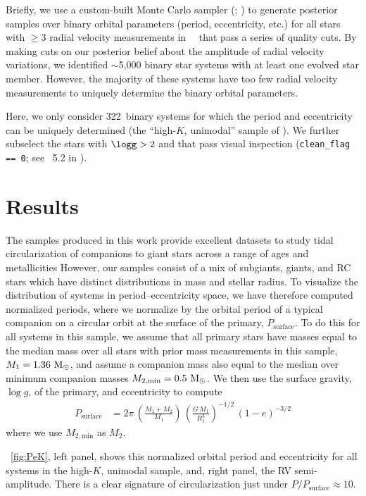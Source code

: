 \documentclass[modern, letterpaper]{aastex62}
\newcommand{\apogee}{\project{\acronym{APOGEE}}}
\newcommand{\DR}{\acronym{DR14}}
\newcommand{\nunimodal}{322}
\begin{document}
Briefly, we use a custom-built Monte Carlo sampler (;
\citealt{Price-Whelan:2017}) to generate posterior samples over binary orbital
parameters (period, eccentricity, etc.) for all stars with $\geq 3$ radial
velocity measurements in \apogee\ \DR\ that pass a series of quality cuts.
By making cuts on our posterior belief about the amplitude of radial velocity
variations, we identified $\sim$5,000 binary star systems with at least one
evolved star member.
However, the majority of these systems have too few radial velocity measurements
to uniquely determine the binary orbital parameters.

Here, we only consider \nunimodal\ binary systems for which the period and
eccentricity can be uniquely determined (the ``high-$K$, unimodal'' sample of
\citealt{Price-Whelan:2018}).
We further subselect the  stars with $\logg > 2$ and that pass visual
inspection (\texttt{clean\_flag == 0}; see \sectionname~5.2 in
\citealt{Price-Whelan:2018}).

\section{Results}
\label{sec:results}

The samples produced in this work provide excellent datasets to study tidal
circularization of companions to giant stars across a range of ages and
metallicities
However, our samples consist of a mix of subgiants, giants, and RC stars which
have distinct distributions in mass and stellar radius.
To visualize the distribution of systems in period--eccentricity space, we have
therefore computed normalized periods, where we normalize by the orbital period
of a typical companion on a circular orbit at the surface of the primary,
$P_{\textrm{surface}}$.
To do this for all systems in this sample, we assume that all primary stars have
masses equal to the median mass over all stars with prior mass measurements in
this sample, $M_1 = 1.36~\mathrm{M}_\odot$, and assume a companion mass also equal to the
median over minimum companion masses $M_{2, \textrm{min}} = 0.5~\mathrm{M}_\odot$.
We then use the surface gravity, $\log g$, of the primary, and eccentricity to
compute
\begin{align}
    P_{\textrm{surface}} &= 2\pi \, \left(\frac{M_1+M_2}{M_1}\right) \,
        \left(\frac{G\,M_1}{R_1^3}\right)^{-1/2} \, \left(1-e\right)^{-3/2}
\end{align}
where we use $M_{2, \textrm{min}}$ as $M_2$.

\figurename~\ref{fig:PeK}, left panel, shows this normalized orbital period and
eccentricity for all systems in the high-$K$, unimodal sample, and, right panel,
the RV semi-amplitude.
There is a clear signature of circularization just under $P/P_{\textrm{surface}}
\approx 10$.
\end{document}
